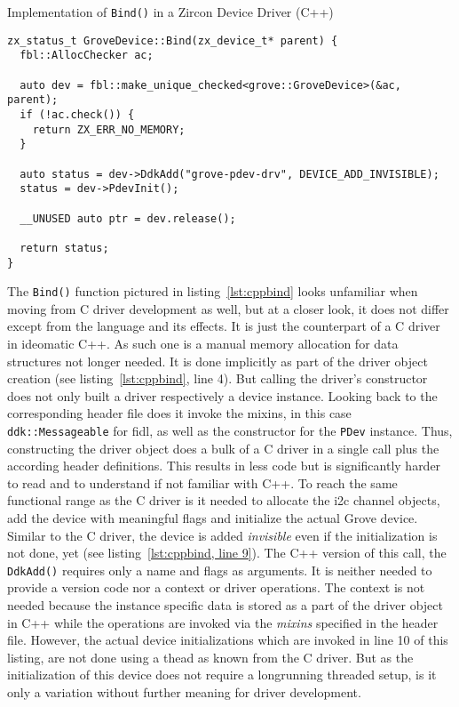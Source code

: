 \begin{listing} [H]
    \caption{Implementation of \texttt{Bind()} in a Zircon Device Driver (C++)}
\label{lst:cppbind}
\begin{verbatim}
zx_status_t GroveDevice::Bind(zx_device_t* parent) {
  fbl::AllocChecker ac;

  auto dev = fbl::make_unique_checked<grove::GroveDevice>(&ac, parent);
  if (!ac.check()) {
    return ZX_ERR_NO_MEMORY;
  }

  auto status = dev->DdkAdd("grove-pdev-drv", DEVICE_ADD_INVISIBLE);
  status = dev->PdevInit();

  __UNUSED auto ptr = dev.release();

  return status;
}
\end{verbatim}
\end{listing}

The \texttt{Bind()} function pictured in listing~\ref{lst:cppbind} looks unfamiliar when moving from C driver development as well, but at a closer look, it does not differ except from the language and its effects.
It is just the counterpart of a C driver in ideomatic C++.
As such one is a manual memory allocation for data structures not longer needed.
It is done implicitly as part of the driver object creation (see listing~\ref{lst:cppbind}, line 4).
But calling the driver's constructor does not only built a driver respectively a device instance.
Looking back to the corresponding header file does it invoke the mixins, in this case \texttt{ddk::Messageable} for \ac{fidl}, as well as the constructor for the \texttt{PDev} instance.
Thus, constructing the driver object does a bulk of a C driver in a single call plus the according header definitions.
This results in less code but is significantly harder to read and to understand if not familiar with C++.
To reach the same functional range as the C driver is it needed to allocate the \ac{i2c} channel objects, add the device with meaningful flags and initialize the actual Grove device.
Similar to the C driver, the device is added \textit{invisible} even if the initialization is not done, yet (see listing~\ref{lst:cppbind, line 9}).
The C++ version of this call, the \texttt{DdkAdd()} requires only a name and flags as arguments.
It is neither needed to provide a version code nor a context or driver operations.
The context is not needed because the instance specific data is stored as a part of the driver object in C++ while the operations are invoked via the \textit{mixins} specified in the header file.
However, the actual device initializations which are invoked in line 10 of this listing, are not done using a thead as known from the C driver.
But as the initialization of this device does not require a longrunning threaded setup, is it only a variation without further meaning for driver development. 


